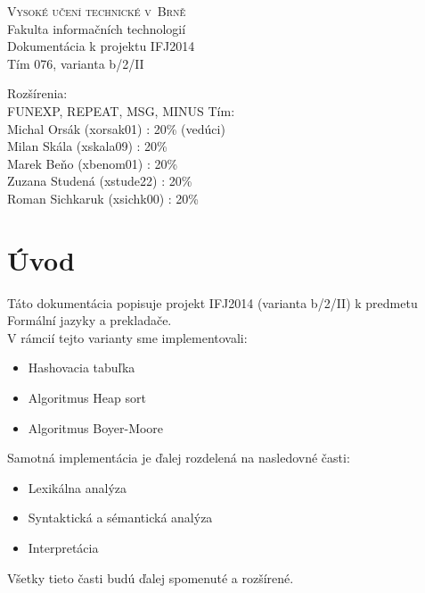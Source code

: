 \documentclass[a4paper]{article}
\begin{document}
\begin{titlepage}
\begin{center}
\textsc{\Huge{Vysoké učení technické v~Brně}}\\
\medskip
\huge{Fakulta informačních technologií}\\
\Large{Dokumentácia  k projektu IFJ2014}\\
\medskip
\Huge{Tím 076, varianta b/2/II}\\
\end{center}

\noindent
Rozšírenia: \\
FUNEXP, REPEAT, MSG, MINUS
\newline
Tím:\\
Michal Orsák (xorsak01) : 20\%  (vedúci) \\
Milan Skála (xskala09) : 20\% \\
Marek Beňo (xbenom01) : 20\% \\
Zuzana Studená (xstude22) : 20\% \\
Roman Sichkaruk (xsichk00) : 20\% 
\end{titlepage}
\indent

\tableofcontents

\newpage
\section{Úvod}
Táto dokumentácia popisuje projekt IFJ2014 (varianta b/2/II) k predmetu Formální jazyky a prekladače.\\
V rámcií tejto varianty sme implementovali:
\begin{itemize}
\item{Hashovacia tabuľka}
\item{Algoritmus Heap sort}
\item{Algoritmus Boyer-Moore}
\end{itemize} 
Samotná implementácia je ďalej rozdelená na nasledovné časti:
\begin{itemize}
\item{Lexikálna analýza}
\item{Syntaktická a sémantická analýza}
\item{Interpretácia}
\end{itemize}
Všetky tieto časti budú ďalej spomenuté a rozšírené.
\end{document}
